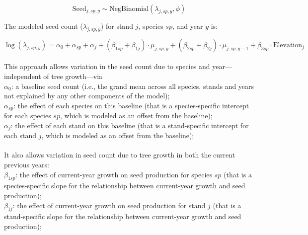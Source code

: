 \documentclass[11pt,letter]{article}
\begin{document}
\[
\text{Seed}_{j,sp,y} \sim \text{NegBinomial}(\lambda_{j,sp,y}, \phi)
\]

The modeled seed count (\(\lambda_{j,sp,y}\)) for stand \(j\), species \(sp\), and year \(y\) is:

\[
\log(\lambda_{j, sp, y}) =\alpha_{0} + \alpha_{sp} + \alpha_{j} + (\beta_{1 sp} + \beta_{1 j}) \cdot \mu_{j,sp,y} + (\beta_{2 sp} + \beta_{2 j}) \cdot \mu_{j,sp,y-1} + \beta_{3 sp} \cdot \text{Elevation}_{j}
\]
\\
This approach allows variation in the seed count due to species and year---independent of tree growth---via \\
\(\alpha_{0}\): a baseline seed count (i.e., the grand mean across all species, stands and years not explained by any other components of the model);\\
\(\alpha_{sp}\): the effect of each species on this baseline (that is a species-specific intercept for each species $sp$, which is modeled as an offset from the baseline);\\ 
\(\alpha_{j}\): the effect of each stand on this baseline (that is a stand-specific intercept for each stand \(j\), which is modeled as an offset from the baseline);\\
\\
It also allows variation in seed count due to tree growth in both the current previous years:\\
\(\beta_{1 sp}\): the effect of current-year growth on seed production for species \(sp\) (that is a species-specific slope for the relationship between current-year growth and seed production);\\
\(\beta_{1 j}\): the effect of current-year growth on seed production for stand \(j\) (that is a stand-specific slope for the relationship between current-year growth and seed production);\\
\end{document}
